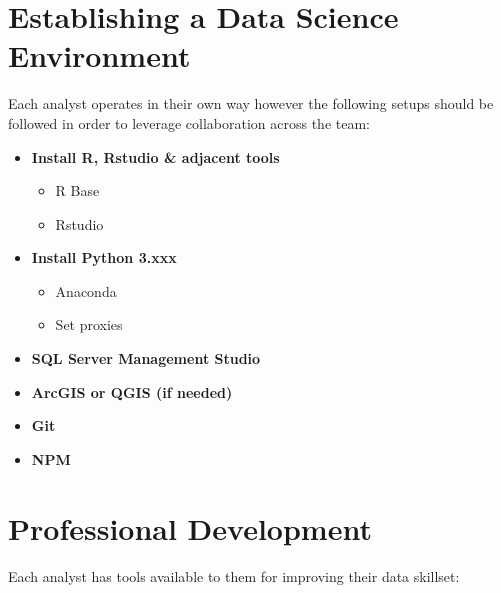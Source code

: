 \documentclass[
]{book}
\begin{document}
\hypertarget{establishing-a-data-science-environment}{%
\section{Establishing a Data Science Environment}\label{establishing-a-data-science-environment}}

Each analyst operates in their own way however the following setups should be followed in order to leverage collaboration across the team:

\begin{itemize}
\item
  \textbf{Install R, Rstudio \& adjacent tools}

  \begin{itemize}
  \item
    R Base
  \item
    Rstudio
  \end{itemize}
\item
  \textbf{Install Python 3.xxx}

  \begin{itemize}
  \item
    Anaconda
  \item
    Set proxies
  \end{itemize}
\item
  \textbf{SQL Server Management Studio}
\item
  \textbf{ArcGIS or QGIS (if needed)}
\item
  \textbf{Git}
\item
  \textbf{NPM}
\end{itemize}

\hypertarget{professional-development}{%
\section{Professional Development}\label{professional-development}}

Each analyst has tools available to them for improving their data skillset:
\end{document}

